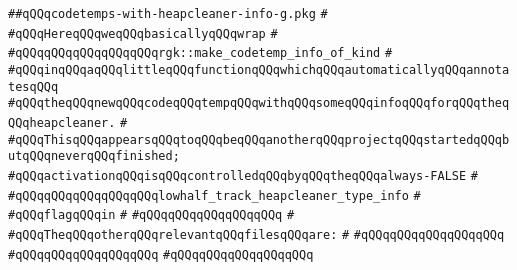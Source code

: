 \label{src/lib/compiler/back/low/heapcleaner-safety/codetemps-with-heapcleaner-info-g.pkg}
\verb|##qQQqcodetemps-with-heapcleaner-info-g.pkg|\newline
\verb|#|\newline
\verb|#qQQqHereqQQqweqQQqbasicallyqQQqwrap|\newline
\verb|#|\newline
\verb|#qQQqqQQqqQQqqQQqqQQqrgk::make_codetemp_info_of_kind|\newline
\verb|#|\newline
\verb|#qQQqinqQQqaqQQqlittleqQQqfunctionqQQqwhichqQQqautomaticallyqQQqannotatesqQQq|\newline
\verb|#qQQqtheqQQqnewqQQqcodeqQQqtempqQQqwithqQQqsomeqQQqinfoqQQqforqQQqtheqQQqheapcleaner.|\newline
\verb|#|\newline
\verb|#qQQqThisqQQqappearsqQQqtoqQQqbeqQQqanotherqQQqprojectqQQqstartedqQQqbutqQQqneverqQQqfinished;|\newline
\verb|#qQQqactivationqQQqisqQQqcontrolledqQQqbyqQQqtheqQQqalways-FALSE|\newline
\verb|#|\newline
\verb|#qQQqqQQqqQQqqQQqqQQqlowhalf_track_heapcleaner_type_info|\newline
\verb|#|\newline
\verb|#qQQqflagqQQqin|\newline
\verb|#|\newline
\verb|#qQQqqQQqqQQqqQQqqQQq|\newline
\verb|#|\newline
\verb|#qQQqTheqQQqotherqQQqrelevantqQQqfilesqQQqare:|\newline
\verb|#|\newline
\verb|#qQQqqQQqqQQqqQQqqQQq|\newline
\verb|#qQQqqQQqqQQqqQQqqQQq|\newline
\verb|#qQQqqQQqqQQqqQQqqQQq|\newline
